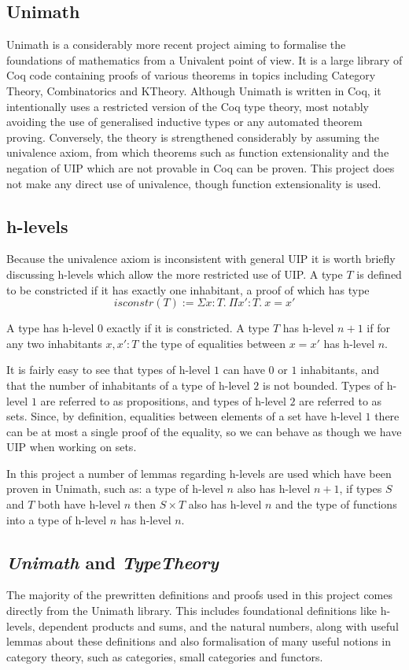 \subsection{Unimath}
Unimath is a considerably more recent project aiming to formalise the
foundations of mathematics from a Univalent point of view. It is a large library
of Coq code containing proofs of various theorems in topics including Category
Theory, Combinatorics and KTheory. Although Unimath is written in Coq, it
intentionally uses a restricted version of the Coq type theory, most notably
avoiding the use of generalised inductive types or any automated theorem
proving. Conversely, the theory is strengthened considerably by assuming the
univalence axiom, from which theorems such as function extensionality and the
negation of UIP which are not provable in Coq can be proven. This project does
not make any direct use of univalence, though function extensionality is used.

\subsection{h-levels}
Because the univalence axiom is inconsistent with general UIP it is worth
briefly discussing h-levels which allow the more restricted use of UIP. A type
$T$ is defined to be constricted if it has exactly one inhabitant, a proof of
which has type
\[isconstr(T) := \Sigma x:T.\ \Pi x':T.\ x=x'\]

A type has h-level $0$ exactly if it is constricted. A type $T$ has h-level
$n+1$ if for any two inhabitants $x, x': T$ the type of equalities between
$x=x'$ has h-level $n$.

It is fairly easy to see that types of h-level $1$ can have $0$ or $1$
inhabitants, and that the number of inhabitants of a type of h-level $2$ is not
bounded. Types of h-level $1$ are referred to as propositions, and types of
h-level $2$ are referred to as sets. Since, by definition, equalities between
elements of a set have h-level $1$ there can be at most a single proof of the
equality, so we can behave as though we have UIP when working on sets.

In this project a number of lemmas regarding h-levels are used which have been
proven in Unimath, such as: a type of h-level $n$ also has h-level $n+1$, if
types $S$ and $T$ both have h-level $n$ then $S\times T$ also has h-level $n$
and the type of functions into a type of h-level $n$ has h-level $n$.

\subsection{\textit{Unimath} and \textit{TypeTheory}}
The majority of the prewritten definitions and proofs used in this project comes
directly from the Unimath library. This includes foundational definitions like
h-levels, dependent products and sums, and the natural numbers, along with
useful lemmas about these definitions and also formalisation of many useful
notions in category theory, such as categories, small categories and functors.

